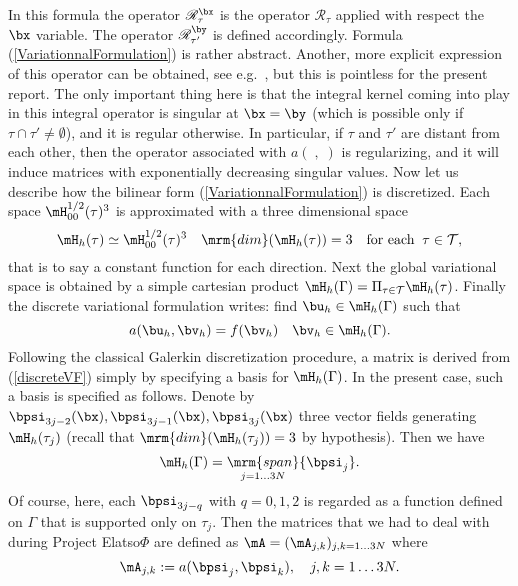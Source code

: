 In this formula the operator $\mathscr{R}_{\tau}^{\bx}$ is the operator $\mathscr{R}_{\tau}$ applied with respect the $\bx$ variable. The operator $\mathscr{R}_{\tau'}^{\by}$ 
is defined accordingly. Formula  (\ref{VariationnalFormulation}) is rather abstract. Another, more explicit expression of this operator can be obtained, 
see e.g.~\cite[\S.3.4.5.3]{Bebendorf2008}, but this is pointless for the present report. The only important thing here is that the integral kernel coming into play in this integral 
operator is singular at $\bx = \by$ (which is possible only if $\tau\cap \tau'\neq \emptyset$), and it is regular otherwise. In particular, if $\tau$ and $\tau'$
are distant from each other, then the operator associated with $a(\;,\;)$ is regularizing, and it will induce matrices with exponentially decreasing singular values.
Now let us describe how the bilinear form (\ref{VariationnalFormulation}) is discretized. Each space $\mH^{1/2}_{00}(\tau)^{3}$ is approximated with a three dimensional 
space 
\[
\mH_{h}(\tau)\simeq \mH^{1/2}_{00}(\tau)^{3}\quad \mrm{dim}(\mH_{h}(\tau)) = 3\quad \textrm{for each}\;\;\tau\in \mathcal{T},
\] 
that is to say a constant function for each direction. Next the global variational space is obtained by a simple cartesian product $\mH_{h}(\Gamma) = \Pi_{\tau\in \mathcal{T}}\mH_{h}(\tau)$.
Finally the discrete variational formulation writes: find $\bu_{h}\in \mH_{h}(\Gamma)$ such that 
\begin{equation}\label{discreteVF}
a(\bu_{h},\bv_{h}) = f(\bv_{h})\quad \bv_{h}\in \mH_{h}(\Gamma).
\end{equation}
Following the classical Galerkin discretization procedure, a matrix is derived from (\ref{discreteVF}) simply by specifying a basis for 
$\mH_{h}(\Gamma)$. In the present case, such a basis is specified as follows. Denote by $\bpsi_{3j-2}(\bx), \bpsi_{3j-1}(\bx),\bpsi_{3j}(\bx)$
three vector fields generating $\mH_{h}(\tau_{j})$ (recall that $\mrm{dim}(\mH_{h}(\tau_{j}) )= 3$ by hypothesis). Then we have 
\[
\mH_{h}(\Gamma) = \mathop{\mrm{span}}_{j=1\dots 3N}\{\bpsi_{j}\}.
\]
Of course, here, each $\bpsi_{3j-q}$ with $q=0,1,2$ is regarded as a function defined on $\Gamma$ that is supported 
only on $\tau_{j}$. Then the matrices that we had to deal with during Project Elatso$\Phi$ are defined as 
$\mA = (\mA_{j,k})_{j,k=1\dots 3N}$ where 
\begin{equation}\label{GalerkinMatrix}
\mA_{j,k}:=a(\bpsi_{j},\bpsi_{k}),\quad j,k = 1\dots 3N.
\end{equation}


